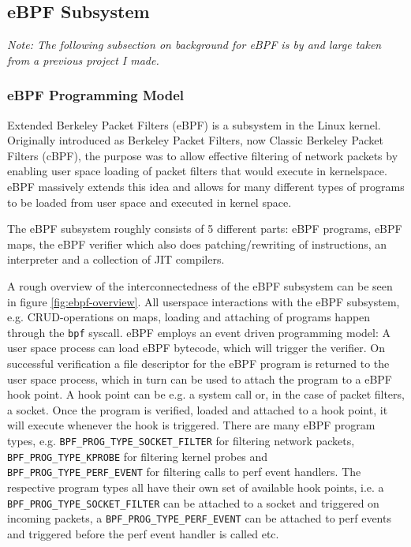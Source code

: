 \subsection{eBPF Subsystem}
\label{subsec:ebpf_subsystem}
\textit{Note: The following subsection on background for eBPF is by and large taken from a previous project I made.\cite{ebpf-fuzz}}
\subsubsection{eBPF Programming Model}

Extended Berkeley Packet Filters (eBPF) is a subsystem in the Linux kernel. Originally introduced as Berkeley Packet Filters, now Classic Berkeley Packet Filters (cBPF)\cite{cBPF-paper}, the purpose was to allow effective filtering of network packets by enabling user space loading of packet filters that would execute in kernelspace. eBPF massively extends this idea and allows for many different types of programs to be loaded from user space and executed in kernel space.


The eBPF subsystem roughly consists of 5 different parts: eBPF programs, eBPF maps, the eBPF verifier which also does patching/rewriting of instructions, an interpreter and a collection of JIT compilers.



A rough overview of the interconnectedness of the eBPF subsystem can be seen in figure \ref{fig:ebpf-overview}. All userspace interactions with the eBPF subsystem, e.g. CRUD-operations on maps, loading and attaching of programs happen through the \verb!bpf! syscall. 
eBPF employs an event driven programming model: A user space process can load eBPF bytecode, which will trigger the verifier. On successful verification a file descriptor for the eBPF program is returned to the user space process, which in turn can be used to attach the program to a eBPF hook point. A hook point can be e.g. a system call or, in the case of packet filters, a socket. Once the program is verified, loaded and attached to a hook point, it will execute whenever the hook is triggered.
There are many eBPF program types, e.g. \verb!BPF_PROG_TYPE_SOCKET_FILTER! for filtering network packets, \verb!BPF_PROG_TYPE_KPROBE! for filtering kernel probes and \verb!BPF_PROG_TYPE_PERF_EVENT! for filtering calls to perf event handlers. The respective program types all have their own set of available hook points, i.e. a \verb!BPF_PROG_TYPE_SOCKET_FILTER! can be attached to a socket and triggered on incoming packets, a \verb!BPF_PROG_TYPE_PERF_EVENT! can be attached to perf events and triggered before the perf event handler is called etc.

